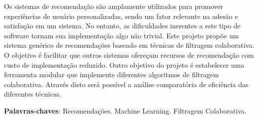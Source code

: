 \documentclass[
	12pt,				%
    oneside,			%
	a4paper,			%
	english,			%
	french,				%
	spanish,			%
	brazil,				%
	]{abntex2}
\begin{document}
\frenchspacing 


\imprimircapa

\imprimirfolhaderosto*






\begin{resumo} %
 Os sistemas de recomendação são amplamente utilizados para promover experiências de usuário personalizadas, 
 sendo um fator relevante na adesão e satisfação em um sistema. No entanto, as dificuldades inerentes a este tipo 
 de software tornam sua implementação algo não trivial. Este projeto propõe um sistema genérico de recomendações
 baseado em técnicas de filtragem colaborativa. O objetivo é facilitar que outros sistemas ofereçam recursos de 
 recomendação com custo de implementação reduzido. Outro objetivo do projeto é estabelecer uma ferramenta modular 
 que implemente diferentes algoritmos de filtragem colaborativa. Através disto será possível a análise comparatória
 de eficiência das diferentes técnicas.


 \vspace{\onelineskip}
    
 \noindent
 \textbf{Palavras-chaves}: Recomendações. Machine Learning. Filtragem Colaborativa. 
\end{resumo} %
\end{document}
